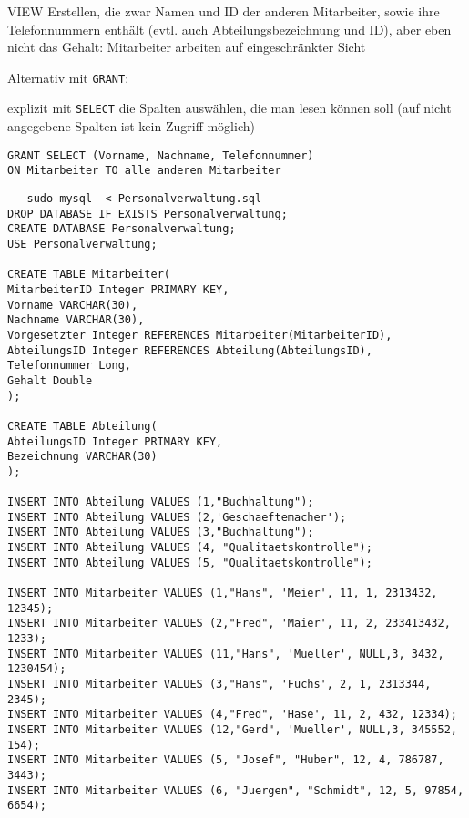 \documentclass{lehramt-informatik-minimal}
\begin{document}
\begin{enumerate}
\begin{antwort}
VIEW Erstellen, die zwar Namen und ID der anderen Mitarbeiter, sowie
ihre Telefonnummern enthält (evtl. auch Abteilungsbezeichnung und ID),
aber eben nicht das Gehalt: Mitarbeiter arbeiten auf eingeschränkter
Sicht

Alternativ mit \verb|GRANT|:

explizit mit \verb|SELECT| die Spalten auswählen,
die man lesen können soll (auf nicht angegebene Spalten ist kein Zugriff
möglich)

\begin{verbatim}
GRANT SELECT (Vorname, Nachname, Telefonnummer)
ON Mitarbeiter TO alle anderen Mitarbeiter
\end{verbatim}
\end{antwort}
\end{enumerate}

\begin{verbatim}
-- sudo mysql  < Personalverwaltung.sql
DROP DATABASE IF EXISTS Personalverwaltung;
CREATE DATABASE Personalverwaltung;
USE Personalverwaltung;

CREATE TABLE Mitarbeiter(
MitarbeiterID Integer PRIMARY KEY,
Vorname VARCHAR(30),
Nachname VARCHAR(30),
Vorgesetzter Integer REFERENCES Mitarbeiter(MitarbeiterID),
AbteilungsID Integer REFERENCES Abteilung(AbteilungsID),
Telefonnummer Long,
Gehalt Double
);

CREATE TABLE Abteilung(
AbteilungsID Integer PRIMARY KEY,
Bezeichnung VARCHAR(30)
);

INSERT INTO Abteilung VALUES (1,"Buchhaltung");
INSERT INTO Abteilung VALUES (2,'Geschaeftemacher');
INSERT INTO Abteilung VALUES (3,"Buchhaltung");
INSERT INTO Abteilung VALUES (4, "Qualitaetskontrolle");
INSERT INTO Abteilung VALUES (5, "Qualitaetskontrolle");

INSERT INTO Mitarbeiter VALUES (1,"Hans", 'Meier', 11, 1, 2313432, 12345);
INSERT INTO Mitarbeiter VALUES (2,"Fred", 'Maier', 11, 2, 233413432, 1233);
INSERT INTO Mitarbeiter VALUES (11,"Hans", 'Mueller', NULL,3, 3432, 1230454);
INSERT INTO Mitarbeiter VALUES (3,"Hans", 'Fuchs', 2, 1, 2313344, 2345);
INSERT INTO Mitarbeiter VALUES (4,"Fred", 'Hase', 11, 2, 432, 12334);
INSERT INTO Mitarbeiter VALUES (12,"Gerd", 'Mueller', NULL,3, 345552, 154);
INSERT INTO Mitarbeiter VALUES (5, "Josef", "Huber", 12, 4, 786787, 3443);
INSERT INTO Mitarbeiter VALUES (6, "Juergen", "Schmidt", 12, 5, 97854, 6654);
\end{verbatim}
\end{document}
